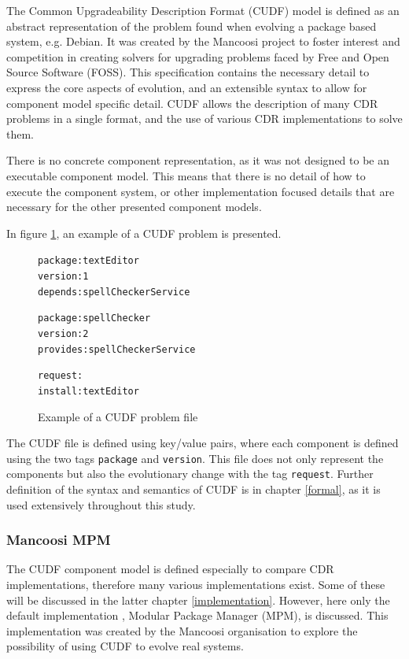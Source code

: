 The Common Upgradeability Description Format (CUDF) model is defined as an abstract representation of the problem found when evolving a package based system, e.g. Debian.
It was created by the Mancoosi project to foster interest and competition in creating solvers for upgrading problems faced by Free and Open Source Software (FOSS).
This specification contains the necessary detail to express the core aspects of evolution, and an extensible syntax to allow for component model specific detail. 
CUDF allows the description of many CDR problems in a single format, and the use of various CDR implementations to solve them. 

There is no concrete component representation, as it was not designed to be an executable component model.
This means that there is no detail of how to execute the component system, or other implementation focused details that are necessary for the other presented component models.

In figure \ref{CUDFmetadata}, an example of a CUDF problem is presented.

\begin{figure}[htp] 
\begin{center}
\begin{alltt}
package: textEditor
version: 1
depends: spellCheckerService

package: spellChecker
version: 2
provides: spellCheckerService

request:
install:textEditor

\end{alltt}
  \caption[CUDF meta-data file]{Example of a CUDF problem file}
  \label{CUDFmetadata}
\end{center}
\end{figure}

The CUDF file is defined using key/value pairs, where each component is defined using the two tags \verb+package+ and \verb+version+.
This file does not only represent the components but also the evolutionary change with the tag \verb+request+.
Further definition of the syntax and semantics of CUDF is in chapter \ref{formal}, as it is used extensively throughout this study.

\subsubsection{Mancoosi MPM}
The CUDF component model is defined especially to compare CDR implementations, therefore many various implementations exist.
Some of these will be discussed in the latter chapter \ref{implementation}.
However, here only the default implementation , Modular Package Manager \citep{abate2011} (MPM), is discussed.
This implementation was created by the Mancoosi organisation to explore the possibility of using CUDF to evolve real systems.

